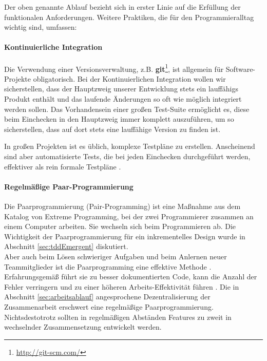 Der oben genannte Ablauf bezieht sich in erster Linie auf die Erfüllung der funktionalen Anforderungen. Weitere Praktiken, die für den Programmieralltag wichtig sind, umfassen:

\paragraph{Kontinuierliche Integration} Die Verwendung einer Versionsverwaltung, z.B. \textbf{git}\footnote{\url{http://git-scm.com/}}, ist allgemein für Software-Projekte obligatorisch. Bei der Kontinuierlichen Integration wollen wir sicherstellen, dass der Hauptzweig unserer Entwicklung stets ein lauffähigs Produkt enthält und das laufende Änderungen so oft wie möglich integriert werden sollen. Das Vorhandensein einer großen Test-Suite ermöglicht es, diese beim Einchecken in den Hauptzweig immer komplett auszuführen, um so sicherstellen, dass auf dort stets eine lauffähige Version zu finden ist.

In großen Projekten ist es üblich, komplexe Testpläne zu erstellen. Anscheinend sind aber automatisierte Tests, die bei jeden Einchecken durchgeführt werden, effektiver als rein formale Testpläne \citep[S. 238]{hunt_pragmatic_1999}.


\paragraph{Regelmäßige Paar-Programmierung} Die Paarprogrammierung (Pair-Programming) ist eine Maßnahme aus dem Katalog von Extreme Programming, bei der zwei Programmierer zusammen an einem Computer arbeiten. Sie wechseln sich beim Programmieren ab. Die Wichtigkeit der Paarprogrammierung für ein inkrementelles Design wurde in Abschnitt \ref{sec:tddEmergent} diskutiert.\\ Aber auch beim Lösen schwieriger Aufgaben und beim Anlernen neuer Teammitglieder ist die Paarprogramming eine effektive Methode \citep[S. 9]{hulkko_multiple_2005}. Erfahrungsgemäß führt sie zu besser dokumentierten Code, kann die Anzahl der Fehler verringern und zu einer höheren Arbeits-Effektivität führen \citep{hulkko_multiple_2005}.
Die in Abschnitt \ref{sec:arbeitsablauf} angesprochene Dezentralisierung der Zusammenarbeit erschwert eine regelmäßige Paarprogrammierung. Nichtsdestotrotz sollten in regelmäßigen Abständen Features zu zweit in wechselnder Zusammensetzung entwickelt werden.

